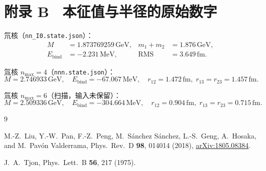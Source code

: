 \documentclass[12pt,a4paper]{article}
\newcommand{\GeV}{\,\mathrm{GeV}}
\newcommand{\MeV}{\,\mathrm{MeV}}
\newcommand{\fm}{\,\mathrm{fm}}
\begin{document}
\section*{附录 B  \ 本征值与半径的原始数字}

氘核（\texttt{nn\_I0.state.json}）：
\begin{align}
  M&=1.873769259\GeV, &
  m_1+m_2&=1.876\GeV,\\
  E_{\mathrm{bind}}&=-2.231\MeV, &
  \mathrm{RMS}&=3.649\fm.
\end{align}

氚核 $n_{\max}=4$（\texttt{nnn.state.json}）：
\begin{equation}
  M=2.746933\GeV,\quad
  E_{\mathrm{bind}}=-67.067\MeV,\quad
  r_{12}=1.472\fm,\;
  r_{13}=r_{23}=1.457\fm.
\end{equation}

氚核 $n_{\max}=6$（扫描，输入未保留）：
\begin{equation}
  M=2.509336\GeV,\quad
  E_{\mathrm{bind}}=-304.664\MeV,\quad
  r_{12}=0.904\fm,\;
  r_{13}=r_{23}=0.715\fm.
\end{equation}

\begin{thebibliography}{9}

M.-Z.~Liu, Y.-W.~Pan, F.-Z.~Peng, M.~S\'anchez S\'anchez, L.-S.~Geng,
A.~Hosaka, and M.~Pav\'on Valderrama,
Phys.\ Rev.\ D \textbf{98}, 014014 (2018),
\href{https://arxiv.org/abs/1805.08384}{arXiv:1805.08384}.

J.~A.~Tjon,
Phys.\ Lett.\ B \textbf{56}, 217 (1975).

\end{thebibliography}
\end{document}

